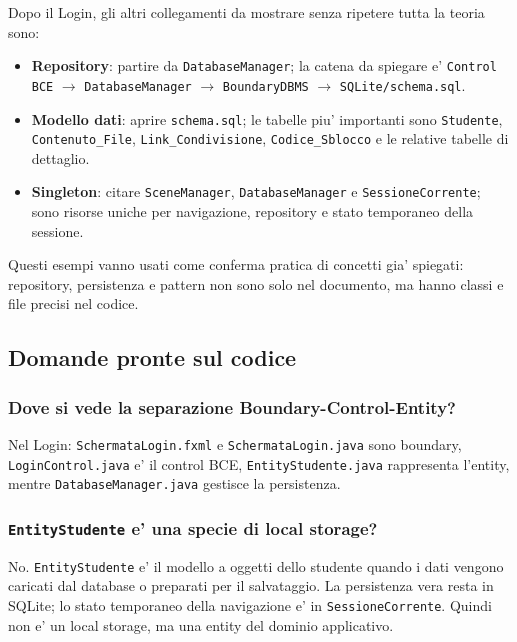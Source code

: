 ﻿\documentclass[11pt,a4paper]{article}
\newcommand{\term}[1]{\textbf{#1}}
\begin{document}
Dopo il Login, gli altri collegamenti da mostrare senza ripetere tutta la teoria sono:
\begin{itemize}
  \item \term{Repository}: partire da \texttt{DatabaseManager}; la catena da spiegare e'
  \texttt{Control BCE} $\rightarrow$ \texttt{DatabaseManager} $\rightarrow$
  \texttt{BoundaryDBMS} $\rightarrow$ \texttt{SQLite/schema.sql}.
  \item \term{Modello dati}: aprire \texttt{schema.sql}; le tabelle piu' importanti sono
  \texttt{Studente}, \texttt{Contenuto\_File}, \texttt{Link\_Condivisione},
  \texttt{Codice\_Sblocco} e le relative tabelle di dettaglio.
  \item \term{Singleton}: citare \texttt{SceneManager}, \texttt{DatabaseManager} e
  \texttt{SessioneCorrente}; sono risorse uniche per navigazione, repository e stato
  temporaneo della sessione.
\end{itemize}

Questi esempi vanno usati come conferma pratica di concetti gia' spiegati: repository,
persistenza e pattern non sono solo nel documento, ma hanno classi e file precisi nel
codice.

\subsection{Domande pronte sul codice}

\subsubsection*{Dove si vede la separazione Boundary-Control-Entity?}

Nel Login: \texttt{SchermataLogin.fxml} e \texttt{SchermataLogin.java} sono boundary,
\texttt{LoginControl.java} e' il control BCE, \texttt{EntityStudente.java} rappresenta
l'entity, mentre \texttt{DatabaseManager.java} gestisce la persistenza.

\subsubsection*{\texttt{EntityStudente} e' una specie di local storage?}

No. \texttt{EntityStudente} e' il modello a oggetti dello studente quando i dati vengono
caricati dal database o preparati per il salvataggio. La persistenza vera resta in SQLite;
lo stato temporaneo della navigazione e' in \texttt{SessioneCorrente}. Quindi non e' un
local storage, ma una entity del dominio applicativo.
\end{document}
